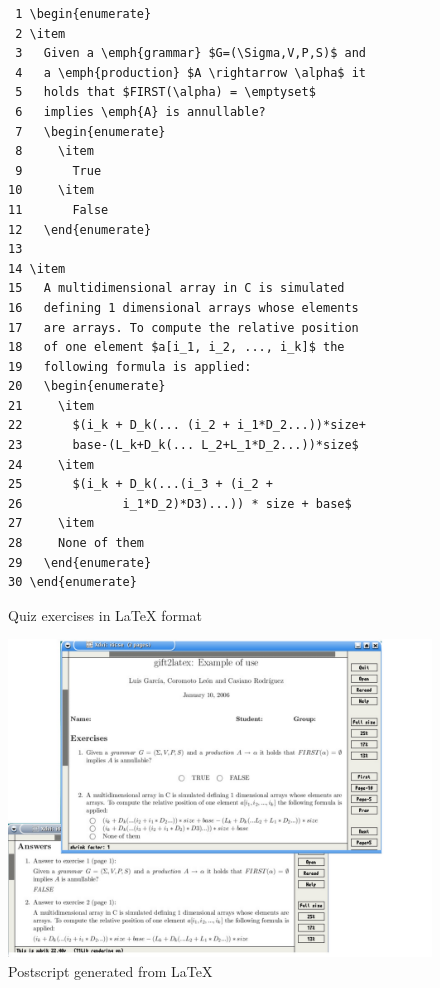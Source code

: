 \documentclass{pracjourn}[2006/02/20]
\begin{document}
\begin{figure}[htb]
\mbox{}\hrulefill
\vspace{-.6em}
\begin{footnotesize}
\begin{verbatim}
 1 \begin{enumerate}
 2 \item
 3   Given a \emph{grammar} $G=(\Sigma,V,P,S)$ and
 4   a \emph{production} $A \rightarrow \alpha$ it
 5   holds that $FIRST(\alpha) = \emptyset$
 6   implies \emph{A} is annullable?
 7   \begin{enumerate}
 8     \item
 9       True
10     \item
11       False
12   \end{enumerate}
13
14 \item
15   A multidimensional array in C is simulated
16   defining 1 dimensional arrays whose elements
17   are arrays. To compute the relative position
18   of one element $a[i_1, i_2, ..., i_k]$ the
19   following formula is applied:
20   \begin{enumerate}
21     \item
22       $(i_k + D_k(... (i_2 + i_1*D_2...))*size+
23       base-(L_k+D_k(... L_2+L_1*D_2...))*size$
24     \item
25       $(i_k + D_k(...(i_3 + (i_2 +
26              i_1*D_2)*D3)...)) * size + base$
27     \item
28     None of them
29   \end{enumerate}
30 \end{enumerate} \end{verbatim}
\end{footnotesize}
\vspace{-1.5em}
\hrulefill
\caption{Quiz exercises in \LaTeX{} format}
\label{fig:autoevaluacionLaTeX}
\end{figure}

\begin{figure}[hbt]
  \begin{center}
    \includegraphics[scale=0.3]{gift2ps}
  \end{center}
\caption{Postscript generated from \LaTeX{}}
\label{fig:ps}
\end{figure}
\end{document}
